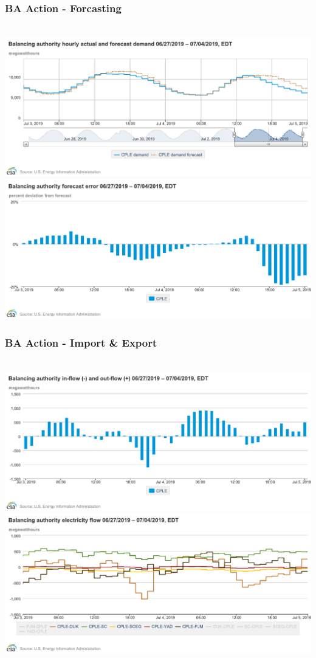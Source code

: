 \documentclass[14pt, unknownkeysallowed]{beamer}
\begin{document}
\begin{frame}
\frametitle{BA Action - Forcasting} \ \vspace{.5em}
{\centering
{\includegraphics[height=.4\textheight]{chart} 
\includegraphics[height=.4\textheight]{chart1}} %
}
\end{frame}
\begin{frame}
\frametitle{BA Action - Import \& Export} \ \vspace{.5em}
{\centering
{\includegraphics[height=.4\textheight]{chart2} 
\includegraphics[height=.4\textheight]{chart3}} %
}
\end{frame}
\end{document}
